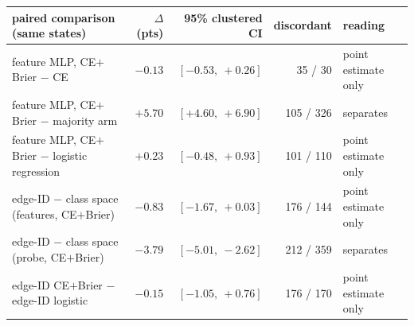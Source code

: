 {\setlength{\tabcolsep}{4.5pt}\begin{tabular}{lrrrl}\toprule
paired comparison (same states) & $\Delta$ (pts) & 95\% clustered CI & discordant & reading \\\midrule
feature MLP, CE$+$Brier $-$ CE & $-0.13$ & $[-0.53,\ +0.26]$ & 35 / 30 & point estimate only \\
feature MLP, CE$+$Brier $-$ majority arm & $+5.70$ & $[+4.60,\ +6.90]$ & 105 / 326 & separates \\
feature MLP, CE$+$Brier $-$ logistic regression & $+0.23$ & $[-0.48,\ +0.93]$ & 101 / 110 & point estimate only \\
edge-ID $-$ class space (features, CE$+$Brier) & $-0.83$ & $[-1.67,\ +0.03]$ & 176 / 144 & point estimate only \\
edge-ID $-$ class space (probe, CE$+$Brier) & $-3.79$ & $[-5.01,\ -2.62]$ & 212 / 359 & separates \\
edge-ID CE$+$Brier $-$ edge-ID logistic & $-0.15$ & $[-1.05,\ +0.76]$ & 176 / 170 & point estimate only \\
\bottomrule\end{tabular}}
